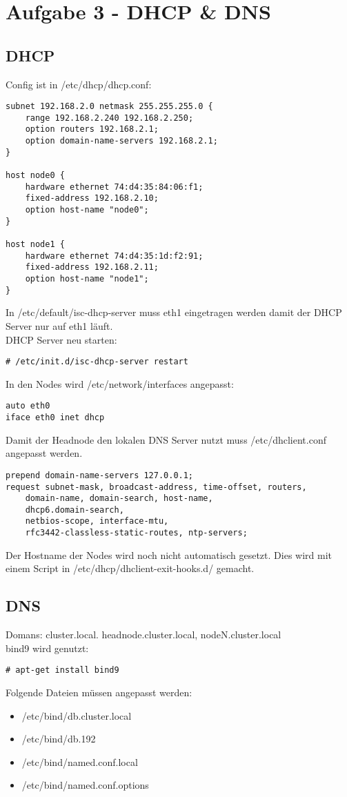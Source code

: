 \chapter{Aufgabe 3 - DHCP \& DNS}
\section{DHCP}
Config ist in /etc/dhcp/dhcp.conf:
\begin{lstlisting}[style=Bash]
subnet 192.168.2.0 netmask 255.255.255.0 {
	range 192.168.2.240 192.168.2.250;
	option routers 192.168.2.1;
	option domain-name-servers 192.168.2.1;
}

host node0 {
	hardware ethernet 74:d4:35:84:06:f1;
	fixed-address 192.168.2.10;
	option host-name "node0";
}

host node1 {
	hardware ethernet 74:d4:35:1d:f2:91;
	fixed-address 192.168.2.11;
	option host-name "node1";
}
\end{lstlisting}
In /etc/default/isc-dhcp-server muss eth1 eingetragen werden damit der DHCP Server nur auf eth1 läuft.\\
DHCP Server neu starten:
\begin{lstlisting}[style=Bash]
# /etc/init.d/isc-dhcp-server restart
\end{lstlisting}
In den Nodes wird /etc/network/interfaces angepasst:
\begin{lstlisting}[style=Bash]
auto eth0
iface eth0 inet dhcp
\end{lstlisting}
Damit der Headnode den lokalen DNS Server nutzt muss /etc/dhclient.conf angepasst werden.
\begin{lstlisting}[style=Bash]
prepend domain-name-servers 127.0.0.1;
request subnet-mask, broadcast-address, time-offset, routers,
	domain-name, domain-search, host-name,
	dhcp6.domain-search,
	netbios-scope, interface-mtu,
	rfc3442-classless-static-routes, ntp-servers;
\end{lstlisting}
Der Hostname der Nodes wird noch nicht automatisch gesetzt. Dies wird mit einem Script in /etc/dhcp/dhclient-exit-hooks.d/ gemacht.
\section{DNS}
Domans: cluster.local. headnode.cluster.local, nodeN.cluster.local\\
bind9 wird genutzt:
\begin{lstlisting}[style=Bash]
# apt-get install bind9
\end{lstlisting}
Folgende Dateien müssen angepasst werden:
\begin {itemize}
\item /etc/bind/db.cluster.local
\item /etc/bind/db.192
\item /etc/bind/named.conf.local
\item /etc/bind/named.conf.options
\end{itemize}
